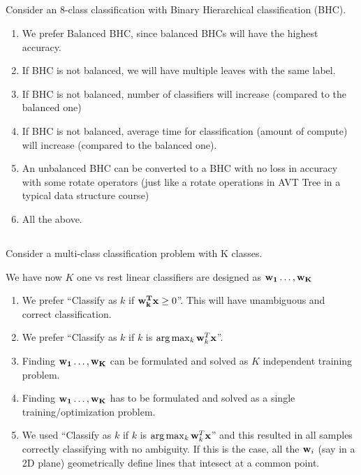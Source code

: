 \begin{frame}
\section{}
Consider an 8-class classification with Binary Hierarchical classification (BHC).
\begin{enumerate}[label=(\Alph*)]
\item We  prefer Balanced BHC, since balanced BHCs will have the highest accuracy.
\item If BHC is not balanced, we will have multiple leaves with the same label.
\item If BHC is not balanced, number of classifiers will increase (compared to the balanced one)
\item If BHC is not balanced, average time for classification (amount of compute) will increase (compared to the balanced one).    %
\item An unbalanced BHC can be converted to a BHC with no loss in accuracy with some rotate operators (just like a rotate operations in AVT Tree in a typical data structure course)
\item All   the above.   %
\end{enumerate}
\end{frame}


\begin{frame}
\section{}
Consider a multi-class classification problem with K classes.

We have now $K$ one vs rest linear classifiers are designed as ${\bf w_1}\ldots, {\bf w_K}$
\begin{enumerate}[label=(\Alph*)]
\item We prefer ``Classify as $k$ if ${\bf w_k^Tx} \geq 0$''. This will have unambiguous and correct classification.
\item We prefer ``Classify as $k$ if $k$ is $\arg \max_k {\bf w}_k^T{\bf x}$''.   %
\item Finding ${\bf w_1}\ldots, {\bf w_K}$ can be formulated and solved as $K$ independent training problem.    %
\item Finding ${\bf w_1}\ldots, {\bf w_K}$ has to  be formulated and solved as a single training/optimization problem.
\item We used ``Classify as $k$ if $k$ is $\arg \max_k {\bf w}_k^T{\bf x}$'' and this resulted in all samples correctly classifying with no ambiguity. If this is the case, all the ${\bf w}_i$ (say in a 2D plane) geometrically define lines that intesect at a common point.   %
\end{enumerate}
\end{frame}

